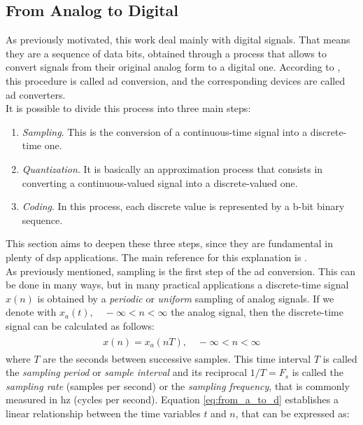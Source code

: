 \subsection{From Analog to Digital} \label{from_a_to_d}
As previously motivated, this work deal mainly with digital signals. That means they are a sequence of data bits, obtained through a process that allows to convert signals from their original analog form to a digital one. According to \cite{proakis2006dimitris}, this procedure is called \gls{ad} conversion, and the corresponding devices are called \gls{ad} converters. \\
It is possible to divide this process into three main steps:
\begin{enumerate}
	\item \textit{Sampling}. This is the conversion of a continuous-time signal into a discrete-time one.
	\item \textit{Quantization}. It is basically an approximation process that consists in converting a continuous-valued signal into a discrete-valued one.
	\item \textit{Coding}. In this process, each discrete value is represented by a b-bit binary sequence.
\end{enumerate}
This section aims to deepen these three steps, since they are fundamental in plenty of \gls{dsp} applications. The main reference for this explanation is \cite{proakis2006dimitris}. \\
As previously mentioned, sampling is the first step of the \gls{ad} conversion.
This can be done in many ways, but in many practical applications a discrete-time signal $x(n)$ is obtained by a \textit{periodic}
or \textit{uniform} sampling of analog signals. If we denote with $x_{a}(t), \quad-\infty<n<\infty$ the analog signal, then the discrete-time signal can be calculated as follows:
\begin{align}\label{eq:from_a_to_d}
	\begin{array}{c}
		x(n)=x_{a}(nT), \quad-\infty<n<\infty
	\end{array}
\end{align}
\noindent where $T$ are the seconds between successive samples. This time interval $T$ is called the \textit{sampling period} or \textit{sample interval} and its reciprocal $1 / T=F_{s}$ is called the \textit{sampling rate} (samples per second) or the \textit{sampling frequency}, that is commonly measured in \gls{hz} (cycles per second). Equation \ref{eq:from_a_to_d} establishes a linear relationship between the time variables $t$ and $n$, that can be expressed as:
